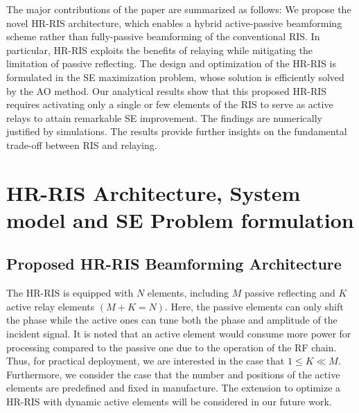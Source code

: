 \documentclass[conference]{IEEEtran}
\begin{document}
	The major contributions of the paper are summarized as follows: We propose the novel HR-RIS architecture, which enables a hybrid active-passive beamforming scheme rather than fully-passive beamforming of the conventional RIS. In particular, HR-RIS exploits the benefits of relaying while mitigating the limitation of passive reflecting. The design and optimization of the HR-RIS is formulated in the SE maximization problem, whose solution is efficiently solved by the AO method. Our analytical results show that this proposed HR-RIS requires activating only a single or few elements of the RIS to serve as active relays to attain remarkable SE improvement. The findings are numerically justified by simulations. The results provide further insights on the fundamental trade-off between RIS and relaying.
	
	
	\section{HR-RIS Architecture, System model and SE Problem formulation}
	\label{sec_system_model}
	
	\subsection{Proposed HR-RIS Beamforming Architecture}
	
	The HR-RIS is equipped with $N$ elements, including $M$ passive reflecting and $K$ active relay elements $(M+K=N)$. Here, the passive elements can only shift the phase while the active ones can tune both the phase and amplitude of the incident signal. It is noted that an active element would consume more power for processing compared to the passive one due to the operation of the RF chain. Thus, for practical deployment, we are interested in the case that $1 \leq K  \ll M$. Furthermore, we consider the case that the number and positions of the active elements are predefined and fixed in manufacture. The extension to optimize a HR-RIS with dynamic active elements will be considered in our future work.
	
\end{document}
